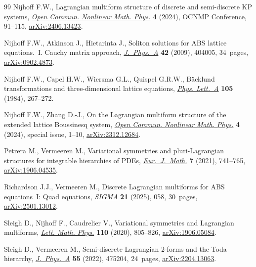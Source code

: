 \documentclass[10pt,a4paper]{amsart}
\numberwithin{equation}{section}
\begin{document}
\begin{thebibliography}{99}
Nijhoff F.W., Lagrangian multiform structure of discrete and semi-discrete {KP}
 systems, \href{https://doi.org/10.46298/ocnmp.13809}{\textit{Open Commun.
 Nonlinear Math. Phys.}} \textbf{4} (2024), OCNMP Conference, 91--115,
 \href{http://arxiv.org/abs/2406.13423}{arXiv:2406.13423}.

Nijhoff F.W., Atkinson J., Hietarinta J., Soliton solutions for {ABS} lattice
 equations.~{I}. {C}auchy matrix approach,
 \href{https://doi.org/10.1088/1751-8113/42/40/404005}{\textit{J.~Phys.~A}}
 \textbf{42} (2009), 404005, 34~pages,
 \href{http://arxiv.org/abs/0902.4873}{arXiv:0902.4873}.

Nijhoff F.W., Capel H.W., Wiersma G.L., Quispel G.R.W., B\"acklund
 transformations and three-dimensional lattice equations,
 \href{https://doi.org/10.1016/0375-9601(84)90994-0}{\textit{Phys. Lett.~A}}
 \textbf{105} (1984), 267--272.

Nijhoff F.W., Zhang D.-J., On the {L}agrangian multiform structure of the
 extended lattice {B}oussinesq system,
 \href{https://doi.org/10.46298/ocnmp.12759}{\textit{Open Commun. Nonlinear
 Math. Phys.}} \textbf{4} (2024), special issue, 1--10,
 \href{http://arxiv.org/abs/2312.12684}{arXiv:2312.12684}.

Petrera M., Vermeeren M., Variational symmetries and pluri-{L}agrangian
 structures for integrable hierarchies of {PDE}s,
 \href{https://doi.org/10.1007/s40879-020-00436-7}{\textit{Eur.~J.~Math.}}
 \textbf{7} (2021), 741--765,
 \href{http://arxiv.org/abs/1906.04535}{arXiv:1906.04535}.

Richardson J.J., Vermeeren M., Discrete {L}agrangian multiforms for {ABS}
 equations~{I}: Quad equations,
 \href{https://doi.org/10.3842/SIGMA.2025.058}{\textit{SIGMA}} \textbf{21}
 (2025), 058, 30~pages,
 \href{http://arxiv.org/abs/2501.13012}{arXiv:2501.13012}.

Sleigh D., Nijhoff F., Caudrelier V., Variational symmetries and {L}agrangian
 multiforms, \href{https://doi.org/10.1007/s11005-019-01240-5}{\textit{Lett.
 Math. Phys.}} \textbf{110} (2020), 805--826,
 \href{http://arxiv.org/abs/1906.05084}{arXiv:1906.05084}.

Sleigh D., Vermeeren M., Semi-discrete {L}agrangian 2-forms and the {T}oda
 hierarchy,
 \href{https://doi.org/10.1088/1751-8121/aca451}{\textit{J.~Phys.~A}}
 \textbf{55} (2022), 475204, 24~pages,
 \href{http://arxiv.org/abs/2204.13063}{arXiv:2204.13063}.


\end{thebibliography}
\end{document}
